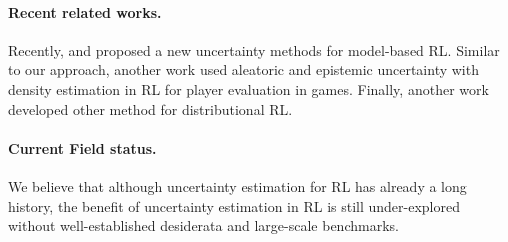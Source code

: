 \paragraph{Recent related works.} Recently, \cite{tennenholtz2022plan} and \cite{wu2022plan} proposed a new uncertainty methods for model-based RL. Similar to our approach, another work \cite{liu2022uncertaintyaware} used aleatoric and epistemic uncertainty with density estimation  in RL for player evaluation in games. Finally, another work \cite{luo2022distributional} developed other method for distributional RL.

\paragraph{Current Field status.} We believe that although uncertainty estimation for RL has already a long history, the benefit of uncertainty estimation in RL is still under-explored without well-established desiderata and large-scale benchmarks.